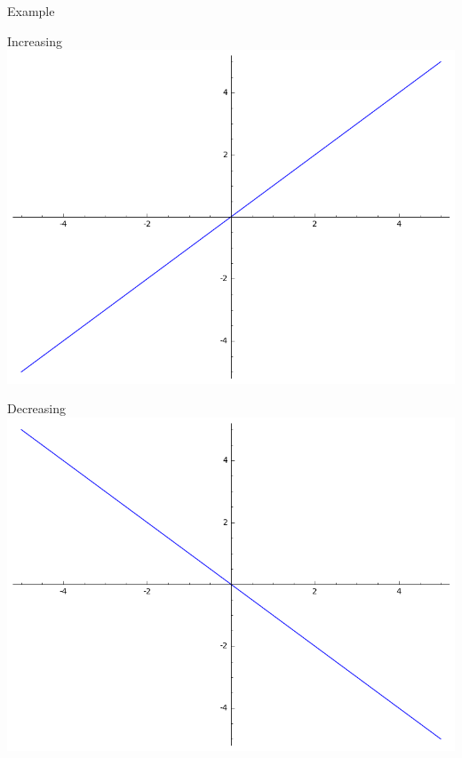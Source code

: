 \documentclass{beamer}
\theoremstyle{definition}
\begin{document}
\begin{frame}{Example}
  \begin{multicols}{2}
    
  \begin{center}
    Increasing\\
    \includegraphics[scale=0.25]{imgs/idGraph.png}
  \end{center}
  \columnbreak
  \pause
  \begin{center}
    Decreasing\\
    \includegraphics[scale=0.25]{imgs/negIdGraph.png}
  \end{center}
  \end{multicols}
\end{frame}
\end{document}
